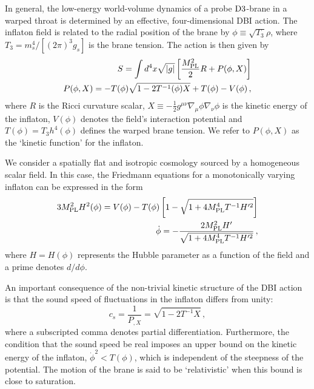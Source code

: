 In general, the low-energy world-volume dynamics
of a probe ${\rm D3}$-brane in a warped throat is determined 
by an effective, four-dimensional DBI action. 
The inflaton field is related to the radial 
position of the brane by 
$\phi \equiv \sqrt{T_3} \rho$, where $T_3 =m_s^4/[(2\pi )^3 g_s ]$ 
is the brane tension. The action is then given by 
\begin{eqnarray}
\label{DBIaction}
S=\int  d^4x \sqrt{|g|} \left[ \frac{M_{\mathrm{PL}}^2}{2} R 
+ P (\phi , X) \right] \\
\label{defP}
P( \phi ,X) = - T (\phi)  \sqrt{1 - 2T^{-1} (\phi ) X}
+T (\phi)  -V(\phi)  \,,
\end{eqnarray}
where $R$ is the Ricci curvature scalar,
$X \equiv - \frac{1}{2} g^{\mu\nu} \nabla_{\mu} \phi \nabla_{\nu} \phi$
is the kinetic energy of the inflaton, $V(\phi )$ denotes 
the field's interaction 
potential and $T(\phi ) = T_3 h^4 (\phi )$
defines the warped brane tension. We refer to $P(\phi , X)$ as the 
`kinetic function' for the inflaton. 
 
We consider a spatially flat and isotropic cosmology 
sourced by a homogeneous scalar field. 
In this case, the Friedmann equations for a monotonically 
varying inflaton can be expressed in the form \cite{brane6} 
\begin{eqnarray}
\label{Friedmann}
3 M_{\mathrm{PL}}^2 H^2(\phi ) = V(\phi ) -T(\phi ) 
\left[ 1- \sqrt{1+4M_{\mathrm{PL}}^4T^{-1} H'^2} \right] \\
\label{useful}
\dot{\phi} = - \frac{2M_{\mathrm{PL}}^2H'}{\sqrt{1+4M_{\mathrm{PL}}^4 T^{-1} H'^2}} \, ,
\end{eqnarray}
where $H=H(\phi )$ represents the Hubble parameter
as a function of the field and a prime denotes $d/d\phi$. 

An important consequence of the non-trivial kinetic structure 
of the DBI action is that the sound speed of fluctuations in the inflaton 
differs from unity:   
\begin{equation}
\label{speedofsound}
c_s = \frac{1}{P_{,X}} = \sqrt{1 -2T^{-1}X}  \,,
\end{equation}
where a subscripted comma denotes partial differentiation. 
Furthermore, the condition that the sound speed be real 
imposes an upper bound on the kinetic energy 
of the inflaton, $\dot{\phi}^2 < T(\phi)$, which 
is independent of the steepness of the potential.
The motion of the brane is said to be `relativistic' when this bound is 
close to saturation.
 
